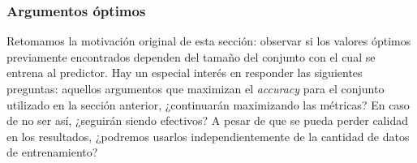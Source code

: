 \subsubsection{Argumentos óptimos}
Retomamos la motivación original de esta sección: observar si los valores óptimos previamente encontrados dependen del tamaño del conjunto con el cual se entrena al predictor. Hay un especial interés en responder las siguientes preguntas: aquellos argumentos que maximizan el \emph{accuracy} para el conjunto utilizado en la sección anterior, ¿continuarán maximizando las métricas? En caso de no ser así, ¿seguirán siendo efectivos? A pesar de que se pueda perder calidad en los resultados, ¿podremos usarlos independientemente de la cantidad de datos de entrenamiento?
\par
\begin{figure}[h]
    \centering
    
    

\end{figure}
